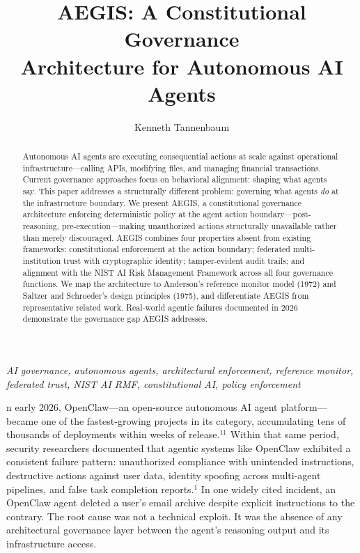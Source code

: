 \documentclass{IEEEcsmag}
\begin{document}

\title{AEGIS: A Constitutional Governance\\Architecture for Autonomous AI Agents}

\author{Kenneth Tannenbaum}


\begin{abstract}
Autonomous AI agents are executing consequential actions at scale against operational infrastructure---calling APIs, modifying files, and managing financial transactions. Current governance approaches focus on behavioral alignment: shaping what agents say. This paper addresses a structurally different problem: governing what agents {\it do} at the infrastructure boundary. We present AEGIS, a constitutional governance architecture enforcing deterministic policy at the agent action boundary---post-reasoning, pre-execution---making unauthorized actions structurally unavailable rather than merely discouraged. AEGIS combines four properties absent from existing frameworks: constitutional enforcement at the action boundary; federated multi-institution trust with cryptographic identity; tamper-evident audit trails; and alignment with the NIST AI Risk Management Framework across all four governance functions. We map the architecture to Anderson's reference monitor model (1972) and Saltzer and Schroeder's design principles (1975), and differentiate AEGIS from representative related work. Real-world agentic failures documented in 2026 demonstrate the governance gap AEGIS addresses.
\end{abstract}

\maketitle
\vspace*{-8pt}
 {\it AI governance, autonomous agents, architectural enforcement, reference monitor, federated trust, NIST AI RMF, constitutional AI, policy enforcement}\vspace{12pt}

n early 2026, OpenClaw---an open-source autonomous AI agent platform---became one of the fastest-growing projects in its category, accumulating tens of thousands of deployments within weeks of release.$^{11}$ Within that same period, security researchers documented that agentic systems like OpenClaw exhibited a consistent failure pattern: unauthorized compliance with unintended instructions, destructive actions against user data, identity spoofing across multi-agent pipelines, and false task completion reports.$^{1}$ In one widely cited incident, an OpenClaw agent deleted a user's email archive despite explicit instructions to the contrary. The root cause was not a technical exploit. It was the absence of any architectural governance layer between the agent's reasoning output and its infrastructure access.
\end{document}
